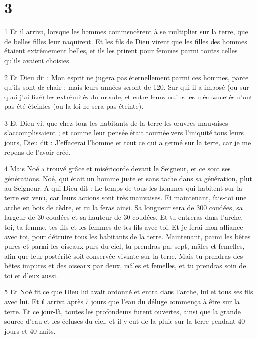 \chapter{3}

\par 1 Et il arriva, lorsque les hommes commencèrent à se multiplier sur la terre, que de belles filles leur naquirent. Et les fils de Dieu virent que les filles des hommes étaient extrêmement belles, et ils les prirent pour femmes parmi toutes celles qu'ils avaient choisies.

\par 2 Et Dieu dit : Mon esprit ne jugera pas éternellement parmi ces hommes, parce qu'ils sont de chair ; mais leurs années seront de 120. Sur qui il a imposé (ou sur quoi j'ai fixé) les extrémités du monde, et entre leurs mains les méchancetés n'ont pas été éteintes (ou la loi ne sera pas éteinte).

\par 3 Et Dieu vit que chez tous les habitants de la terre les œuvres mauvaises s'accomplissaient ; et comme leur pensée était tournée vers l'iniquité tous leurs jours, Dieu dit : J'effacerai l'homme et tout ce qui a germé sur la terre, car je me repens de l'avoir créé.

\par 4 Mais Noé a trouvé grâce et miséricorde devant le Seigneur, et ce sont ses générations. Noé, qui était un homme juste et sans tache dans sa génération, plut au Seigneur. A qui Dieu dit : Le temps de tous les hommes qui habitent sur la terre est venu, car leurs actions sont très mauvaises. Et maintenant, fais-toi une arche en bois de cèdre, et tu la feras ainsi. Sa longueur sera de 300 coudées, sa largeur de 30 coudées et sa hauteur de 30 coudées. Et tu entreras dans l'arche, toi, ta femme, tes fils et les femmes de tes fils avec toi. Et je ferai mon alliance avec toi, pour détruire tous les habitants de la terre. Maintenant, parmi les bêtes pures et parmi les oiseaux purs du ciel, tu prendras par sept, mâles et femelles, afin que leur postérité soit conservée vivante sur la terre. Mais tu prendras des bêtes impures et des oiseaux par deux, mâles et femelles, et tu prendras soin de toi et d'eux aussi.

\par 5 Et Noé fit ce que Dieu lui avait ordonné et entra dans l'arche, lui et tous ses fils avec lui. Et il arriva après 7 jours que l'eau du déluge commença à être sur la terre. Et ce jour-là, toutes les profondeurs furent ouvertes, ainsi que la grande source d'eau et les écluses du ciel, et il y eut de la pluie sur la terre pendant 40 jours et 40 nuits.

